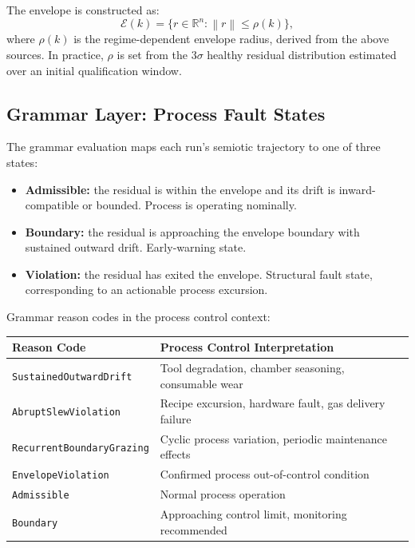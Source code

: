 \documentclass[11pt,letterpaper]{article}
\theoremstyle{scresult}
\newcommand{\R}{\mathbb{R}}
\newcommand{\norm}[1]{\left\|#1\right\|}
\begin{document}
The envelope is constructed as:
\begin{equation}
  \mathcal{E}(k) = \{r \in \R^n : \norm{r} \leq \rho(k)\},
\end{equation}
where $\rho(k)$ is the regime-dependent envelope radius, derived from the
above sources. In practice, $\rho$ is set from the $3\sigma$ healthy residual
distribution estimated over an initial qualification window.

\subsection{Grammar Layer: Process Fault States}

The grammar evaluation maps each run's semiotic trajectory to one of three
states:
\begin{itemize}
  \item \textbf{Admissible:} the residual is within the envelope and its
        drift is inward-compatible or bounded. Process is operating nominally.
  \item \textbf{Boundary:} the residual is approaching the envelope boundary
        with sustained outward drift. Early-warning state.
  \item \textbf{Violation:} the residual has exited the envelope. Structural
        fault state, corresponding to an actionable process excursion.
\end{itemize}

Grammar reason codes in the process control context:
\begin{center}
\small
\renewcommand{\arraystretch}{1.3}
\begin{tabular}{@{}p{4.5cm}p{7cm}@{}}
\toprule
\textbf{Reason Code} & \textbf{Process Control Interpretation} \\
\midrule
\texttt{SustainedOutwardDrift} & Tool degradation, chamber seasoning,
  consumable wear \\
\texttt{AbruptSlewViolation} & Recipe excursion, hardware fault, gas
  delivery failure \\
\texttt{RecurrentBoundaryGrazing} & Cyclic process variation, periodic
  maintenance effects \\
\texttt{EnvelopeViolation} & Confirmed process out-of-control condition \\
\texttt{Admissible} & Normal process operation \\
\texttt{Boundary} & Approaching control limit, monitoring recommended \\
\bottomrule
\end{tabular}
\end{center}
\end{document}
